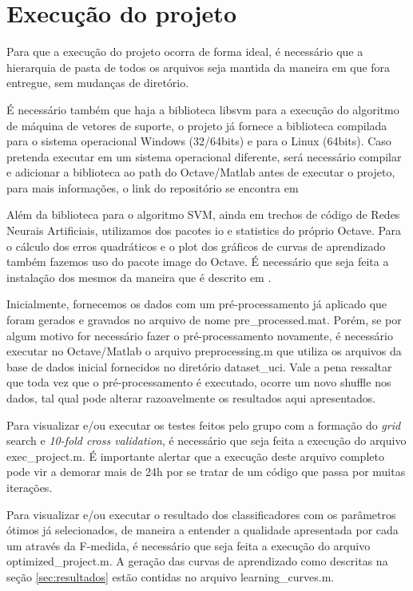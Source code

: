 \documentclass[10pt, conference, compsocconf]{IEEEtran}
\begin{document}
%



\appendix
\section{Execução do projeto}\label{apendice_execucao}
Para que a execução do projeto ocorra de forma ideal, é necessário que a 
hierarquia de pasta de todos os arquivos seja mantida da maneira em que fora 
entregue, sem mudanças de diretório.

É necessário também que haja a biblioteca libsvm para a execução do algoritmo 
de máquina de vetores de suporte, o projeto já fornece a biblioteca compilada 
para o sistema operacional Windows (32/64bits) e para o Linux (64bits). 
Caso pretenda executar em um sistema operacional diferente, será necessário 
compilar e adicionar a biblioteca ao path do Octave/Matlab antes de executar o 
projeto, para mais informações, o link do repositório se encontra em
\cite{libsvm}

Além da biblioteca para o algoritmo SVM, ainda em trechos de código de Redes 
Neurais Artificiais, utilizamos dos pacotes io e statistics do próprio Octave. 
Para o cálculo dos erros quadráticos e o plot dos gráficos de curvas de 
aprendizado também fazemos uso do pacote image do Octave. É necessário que 
seja feita a instalação dos mesmos da maneira que é descrito em
\cite{octave:install_remove}. 

Inicialmente, fornecemos os dados com um pré-processamento já aplicado que 
foram gerados e gravados no arquivo de nome pre\_processed.mat. Porém, se por 
algum motivo for necessário fazer o pré-processamento novamente, é necessário 
executar no Octave/Matlab o arquivo preprocessing.m que utiliza os arquivos da 
base de dados inicial fornecidos no diretório dataset\_uci. Vale a pena 
ressaltar que toda vez que o pré-processamento é executado, ocorre um novo 
shuffle nos dados, tal qual pode alterar razoavelmente os resultados aqui apresentados.

Para visualizar e/ou executar os testes feitos pelo grupo com a formação do 
\textit{grid} search e \textit{10-fold cross validation}, é necessário que seja feita a execução 
do arquivo exec\_project.m. É importante alertar que a execução deste arquivo 
completo pode vir a demorar mais de 24h por se tratar de um código que passa 
por muitas iterações.

Para visualizar e/ou executar o resultado dos classificadores com os parâmetros
ótimos já selecionados, de maneira a entender a qualidade apresentada por cada 
um através da F-medida, é necessário que seja feita a execução do arquivo 
optimized\_project.m.
A geração das curvas de aprendizado como descritas na seção
\ref{sec:resultados} estão contidas no arquivo learning\_curves.m.


\end{document}

